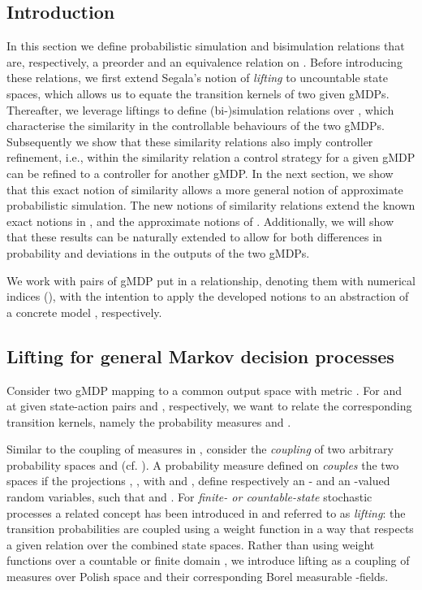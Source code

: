 \documentclass[letterpaper, 10 pt, conference]{amsart}
\theoremstyle{definition}
\theoremstyle{example}
\theoremstyle{remark}
\begin{document}
\subsection{Introduction}
In this section we define probabilistic simulation and bisimulation relations that are, respectively, a preorder and an equivalence relation on . 
Before introducing these relations, 
we first extend Segala's notion \cite{Segala1995,Segala1995a} of \emph{lifting} to uncountable state spaces, which allows us to equate the transition kernels of two given gMDPs.  
Thereafter, we leverage liftings to define (bi-)simulation relations over , which characterise the similarity in the controllable behaviours of the two gMDPs.  
Subsequently we show that these similarity relations also imply controller refinement, 
i.e., within the similarity relation a control strategy for a given gMDP can be refined to a controller for another gMDP. 
In the next section, we show that this exact notion of similarity allows a more general notion of approximate probabilistic simulation. 
The new notions of similarity relations extend the known exact notions in \cite{larsen1991bisimulation}, and the approximate notions of \cite{Desharnais2008,cDAK12}. 
Additionally,  we will show that these results can be naturally extended to allow for both differences in probability and deviations in the outputs of the two gMDPs. 


We work with pairs of gMDP put in a relationship, denoting them with numerical indices (), 
with the intention to apply the developed notions to an abstraction  of a concrete model , 
respectively.  

\subsection{Lifting for general Markov decision processes}
 
Consider two gMDP  mapping to a common output space  with metric .
For  and  at given state-action pairs  and , respectively, 
we want to relate the corresponding transition kernels, 
namely the probability measures   and . 

Similar to the coupling of measures in  \cite{art2014,lindvall2002lectures}, 
consider the \emph{coupling} of two arbitrary probability spaces  and  (cf. \cite{skala1993,strassen1965}).  
A probability measure  
defined on  \emph{couples} the two spaces if the projections , ,  
with  and , 
define respectively an - and an -valued random variables, 
such that  and .   
For \emph{finite- or countable-state} stochastic processes a related concept has been introduced in \cite{Segala1995,Segala1995a}  
and referred to as \emph{lifting}:  
the transition probabilities are coupled using a weight function in a way that respects a given relation over the combined state spaces. Rather than using weight functions over a countable or finite domain \cite{Segala1995}, 
we introduce lifting as a coupling of measures over Polish space and their corresponding Borel measurable -fields. 
\end{document}
